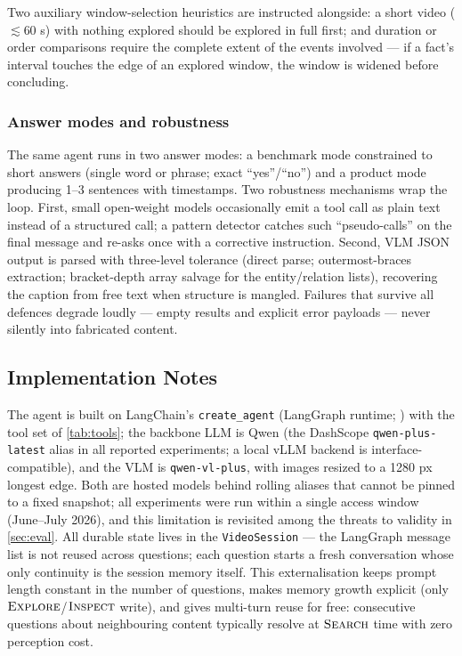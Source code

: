 Two auxiliary window-selection heuristics are instructed alongside: a short video ($\lesssim$60 s)
with nothing explored should be explored in full first; and duration or order comparisons require
the complete extent of the events involved --- if a fact's interval touches the edge of an explored
window, the window is widened before concluding.

\subsubsection{Answer modes and robustness}
\label{subsubsec:modes}

The same agent runs in two answer modes: a benchmark mode constrained to short answers (single
word or phrase; exact ``yes''/``no'') and a product mode producing 1--3 sentences with timestamps.
Two robustness mechanisms wrap the loop. First, small open-weight models occasionally emit a
tool call as plain text instead of a structured call; a pattern detector catches such
``pseudo-calls'' on the final message and re-asks once with a corrective instruction. Second, VLM
JSON output is parsed with three-level tolerance (direct parse; outermost-braces extraction;
bracket-depth array salvage for the entity/relation lists), recovering the caption from free text
when structure is mangled. Failures that survive all defences degrade loudly --- empty results and
explicit error payloads --- never silently into fabricated content.

\subsection{Implementation Notes}
\label{subsec:impl}

The agent is built on LangChain's \texttt{create\_agent} (LangGraph runtime; \cite{langchain2022}) with the tool
set of \cref{tab:tools}; the backbone LLM is Qwen (the DashScope \texttt{qwen-plus-latest} alias in all
reported experiments; a local vLLM backend is interface-compatible), and the VLM is
\texttt{qwen-vl-plus}, with images resized to a 1280 px longest edge. Both are hosted models behind
rolling aliases that cannot be pinned to a fixed snapshot; all experiments were run within a
single access window (June--July 2026), and this limitation is revisited among the threats to
validity in \cref{sec:eval}. All durable state lives in the \texttt{VideoSession} --- the LangGraph message list
is not reused across questions; each question starts a fresh conversation whose only continuity
is the session memory itself. This externalisation keeps prompt length constant in the number of
questions, makes memory growth explicit (only $\textsc{Explore}$/$\textsc{Inspect}$ write), and
gives multi-turn reuse for free: consecutive questions about neighbouring content typically
resolve at $\textsc{Search}$ time with zero perception cost.

